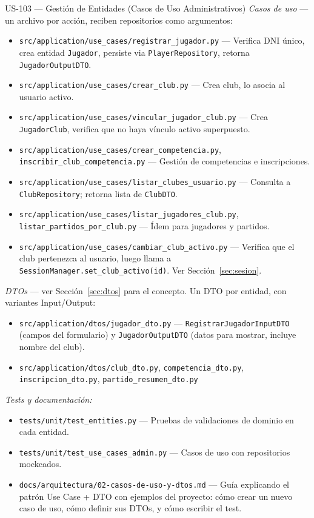 \documentclass[11pt,a4paper]{article}
\newcommand{\fpath}[1]{\texttt{\small #1}}
\begin{document}
\begin{uscard}{US-103 — Gestión de Entidades (Casos de Uso Administrativos)}
\textit{Casos de uso} — un archivo por acción, reciben repositorios como argumentos:
\begin{itemize}[nosep, leftmargin=1.6em]
  \item \fpath{src/application/use\_cases/registrar\_jugador.py} — Verifica DNI único, crea entidad \fpath{Jugador}, persiste via \fpath{PlayerRepository}, retorna \fpath{JugadorOutputDTO}.
  \item \fpath{src/application/use\_cases/crear\_club.py} — Crea club, lo asocia al usuario activo.
  \item \fpath{src/application/use\_cases/vincular\_jugador\_club.py} — Crea \fpath{JugadorClub}, verifica que no haya vínculo activo superpuesto.
  \item \fpath{src/application/use\_cases/crear\_competencia.py}, \fpath{inscribir\_club\_competencia.py} — Gestión de competencias e inscripciones.
  \item \fpath{src/application/use\_cases/listar\_clubes\_usuario.py} — Consulta a \fpath{ClubRepository}; retorna lista de \fpath{ClubDTO}.
  \item \fpath{src/application/use\_cases/listar\_jugadores\_club.py}, \fpath{listar\_partidos\_por\_club.py} — Ídem para jugadores y partidos.
  \item \fpath{src/application/use\_cases/cambiar\_club\_activo.py} — Verifica que el club pertenezca al usuario, luego llama a \fpath{SessionManager.set\_club\_activo(id)}. Ver Sección~\ref{sec:sesion}.
\end{itemize}

\textit{DTOs} — ver Sección~\ref{sec:dtos} para el concepto. Un DTO por entidad, con variantes Input/Output:
\begin{itemize}[nosep, leftmargin=1.6em]
  \item \fpath{src/application/dtos/jugador\_dto.py} — \fpath{RegistrarJugadorInputDTO} (campos del formulario) y \fpath{JugadorOutputDTO} (datos para mostrar, incluye nombre del club).
  \item \fpath{src/application/dtos/club\_dto.py}, \fpath{competencia\_dto.py}, \fpath{inscripcion\_dto.py}, \fpath{partido\_resumen\_dto.py}
\end{itemize}

\textit{Tests y documentación:}
\begin{itemize}[nosep, leftmargin=1.6em]
  \item \fpath{tests/unit/test\_entities.py} — Pruebas de validaciones de dominio en cada entidad.
  \item \fpath{tests/unit/test\_use\_cases\_admin.py} — Casos de uso con repositorios mockeados.
  \item \fpath{docs/arquitectura/02-casos-de-uso-y-dtos.md} — Guía explicando el patrón Use Case + DTO con ejemplos del proyecto: cómo crear un nuevo caso de uso, cómo definir sus DTOs, y cómo escribir el test.
\end{itemize}


\end{uscard}
\end{document}
